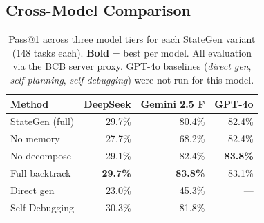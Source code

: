 \documentclass[11pt,twocolumn]{article}
\begin{document}
\subsection{Cross-Model Comparison}

\begin{table}[H]
\centering
\caption{Pass@1 across three model tiers for each StateGen variant (148 tasks
each). \textbf{Bold} = best per model. All evaluation via the BCB server proxy.
GPT-4o baselines (\emph{direct gen}, \emph{self-planning}, \emph{self-debugging})
were not run for this model.}
\label{tab:crossmodel}
\setlength{\tabcolsep}{4pt}
\begin{tabular}{lrrr}
\toprule
\textbf{Method} & \textbf{DeepSeek} & \textbf{Gemini 2.5 F} & \textbf{GPT-4o} \\
\midrule
StateGen (full)  & 29.7\%          & 80.4\%           & 82.4\%           \\
No memory        & 27.7\%          & 68.2\%           & 82.4\%           \\
No decompose     & 29.1\%          & 82.4\%           & \textbf{83.8\%}  \\
Full backtrack   & \textbf{29.7\%} & \textbf{83.8\%}  & 83.1\%           \\
\midrule
Direct gen       & 23.0\%          & 45.3\%           & ---              \\
Self-Debugging   & 30.3\%          & 81.8\%           & ---              \\
\bottomrule
\end{tabular}
\end{table}
\end{document}

